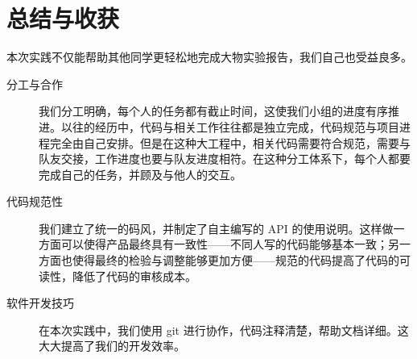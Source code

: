 \section{总结与收获}

本次实践不仅能帮助其他同学更轻松地完成大物实验报告，我们自己也受益良多。

\begin{description}
  \item[分工与合作] 我们分工明确，每个人的任务都有截止时间，这使我们小组的进度有序推进。以往的经历中，代码与相关工作往往都是独立完成，代码规范与项目进程完全由自己安排。但是在这种大工程中，相关代码需要符合规范，需要与队友交接，工作进度也要与队友进度相符。在这种分工体系下，每个人都要完成自己的任务，并顾及与他人的交互。
  \item[代码规范性] 我们建立了统一的码风，并制定了自主编写的 API 的使用说明。这样做一方面可以使得产品最终具有一致性——不同人写的代码能够基本一致；另一方面也使得最终的检验与调整能够更加方便——规范的代码提高了代码的可读性，降低了代码的审核成本。
  \item[软件开发技巧] 在本次实践中，我们使用 git 进行协作，代码注释清楚，帮助文档详细。这大大提高了我们的开发效率。
\end{description}
